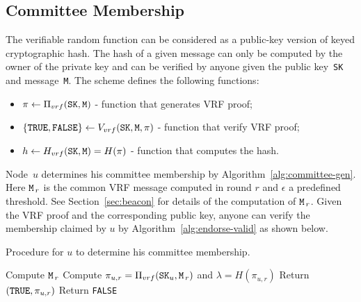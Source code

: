 \documentclass{article}
\begin{document}
\subsection{Committee Membership}
\label{sec:committee}
The verifiable random function can be considered as a public-key version of keyed cryptographic hash. The hash of a given message can only be computed by the owner of the private key and can be verified by anyone given the public key~{\tt SK} and message~{\tt M}. The scheme defines the following functions:
\begin{itemize}
    \item $\pi\leftarrow\Pi_{vrf}({\tt SK},{\tt M})$ - function that generates VRF proof;
    \item $\{{\tt TRUE}, {\tt FALSE}\}\leftarrow V_{vrf}({\tt SK},{\tt M},\pi)$ - function that verify VRF proof;
    \item $h\leftarrow H_{vrf}({\tt SK},{\tt M})=H(\pi)$ - function that computes the hash.
\end{itemize}

Node~$u$ determines his committee membership by Algorithm~\ref{alg:committee-gen}. Here ${\tt M}_{\,r}$ is the common VRF message computed in round $r$ and $\epsilon$ a predefined threshold. See Section~\ref{sec:beacon} for details of the computation of ${\tt M}_{\,r}$. Given the VRF proof and the corresponding public key, anyone can verify the membership claimed by $u$ by Algorithm~\ref{alg:endorse-valid} as shown below.

\begin{algorithm}[H]
\caption{Procedure for $u$ to determine his committee membership. }
\label{alg:committee-gen}
\begin{spacing}{1.2}
\begin{algorithmic}[1]
    \vspace{1ex}
    \State Compute ${\tt M}_{\,r}$
    \State Compute $\pi_{u,r} = \Pi_{vrf}({\tt SK}_u,{\tt M}_{\,r})$ and $\lambda=H\left(\pi_{u,r}\right)$
    \vspace{1ex}
    \If{$\lambda\leq\epsilon$}
        \State Return $\left({\tt TRUE},\pi_{u,r}\right)$
    \Else 
        \State Return {\tt FALSE}
    \EndIf
\end{algorithmic}
\end{spacing}
\end{algorithm}
\end{document}
